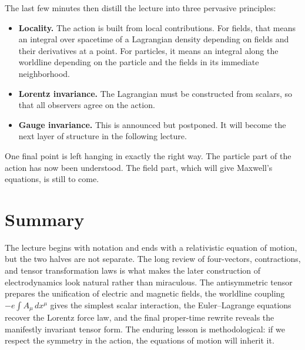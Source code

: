 The last few minutes then distill the lecture into three pervasive principles:
\begin{itemize}
\item \textbf{Locality.} The action is built from local contributions. For fields, that means an integral over spacetime of a Lagrangian density depending on fields and their derivatives at a point. For particles, it means an integral along the worldline depending on the particle and the fields in its immediate neighborhood.
\item \textbf{Lorentz invariance.} The Lagrangian must be constructed from scalars, so that all observers agree on the action.
\item \textbf{Gauge invariance.} This is announced but postponed. It will become the next layer of structure in the following lecture.
\end{itemize}

One final point is left hanging in exactly the right way. The particle part of the action has now been understood. The field part, which will give Maxwell's equations, is still to come.

\section{Summary}

The lecture begins with notation and ends with a relativistic equation of motion, but the two halves are not separate. The long review of four-vectors, contractions, and tensor transformation laws is what makes the later construction of electrodynamics look natural rather than miraculous. The antisymmetric tensor prepares the unification of electric and magnetic fields, the worldline coupling $-e\int A_\mu\,dx^\mu$ gives the simplest scalar interaction, the Euler--Lagrange equations recover the Lorentz force law, and the final proper-time rewrite reveals the manifestly invariant tensor form. The enduring lesson is methodological: if we respect the symmetry in the action, the equations of motion will inherit it.